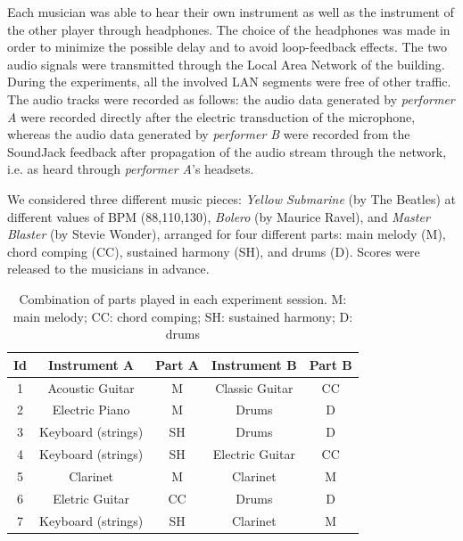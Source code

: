 Each musician was able to hear their own instrument as well as the instrument of the other player through headphones. The choice of the headphones was made in order to minimize the possible delay and to avoid loop-feedback effects. The two audio signals were transmitted through the Local Area Network of the building. During the experiments, all the involved LAN segments were free of other traffic. The audio tracks were recorded as follows: the audio data generated by \textit{performer A} were recorded directly after the electric transduction of the microphone, whereas the audio data generated by \textit{performer B} were recorded from the SoundJack feedback after propagation of the audio stream through the network, i.e. as heard through \textit{performer A}'s headsets.

We considered three different music pieces: \textit{Yellow Submarine} (by The Beatles) at different values of BPM (88,110,130), \textit{Bolero} (by Maurice Ravel), and \textit{Master Blaster} (by Stevie Wonder), arranged for four different parts: main melody (M), chord comping (CC), sustained harmony (SH), and drums (D).  Scores were released to the musicians in advance.

\begin{table}[tb]
  \caption{Combination of parts played in each experiment session. M: main melody; CC: chord comping; SH: sustained harmony; D: drums}
  \centering %
  \label{tab:NMP:sessions}
  \bgroup
  \def\arraystretch{1.5}
 \begin{tabular}{||c|c|c|c|c||}
 \hline
 \hline
  Id & Instrument A& Part A & Instrument B & Part B \\
 \hline
 \hline
  1 & Acoustic Guitar & M & Classic Guitar & CC\\
  2 & Electric Piano & M & Drums & D\\
  3 & Keyboard (strings)  & SH & Drums & D\\
  4 & Keyboard (strings)  & SH & Electric Guitar & CC\\
  5 & Clarinet & M & Clarinet & M\\
  6 & Eletric Guitar  & CC & Drums & D\\
  7 & Keyboard (strings)  & SH & Clarinet & M\\
 \hline
 \hline
   \end{tabular}
   \egroup
\end{table}


